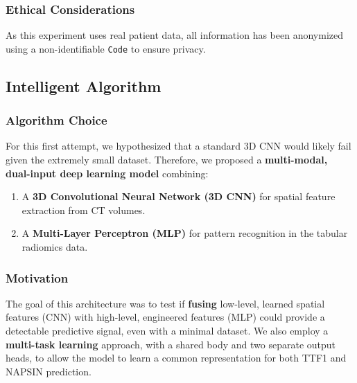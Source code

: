 \subsubsection{Ethical Considerations}
As this experiment uses real patient data, all information has been anonymized using a non-identifiable \texttt{Code} to ensure privacy.

\subsection{Intelligent Algorithm}

\subsubsection{Algorithm Choice}
For this first attempt, we hypothesized that a standard 3D CNN would likely fail given the extremely small dataset. Therefore, we proposed a \textbf{multi-modal, dual-input deep learning model} combining:
\begin{enumerate}
    \item A \textbf{3D Convolutional Neural Network (3D CNN)} for spatial feature extraction from CT volumes.
    \item A \textbf{Multi-Layer Perceptron (MLP)} for pattern recognition in the tabular radiomics data.
\end{enumerate}

\subsubsection{Motivation}
The goal of this architecture was to test if \textbf{fusing} low-level, learned spatial features (CNN) with high-level, engineered features (MLP) could provide a detectable predictive signal, even with a minimal dataset. We also employ a \textbf{multi-task learning} approach, with a shared body and two separate output heads, to allow the model to learn a common representation for both TTF1 and NAPSIN prediction.

